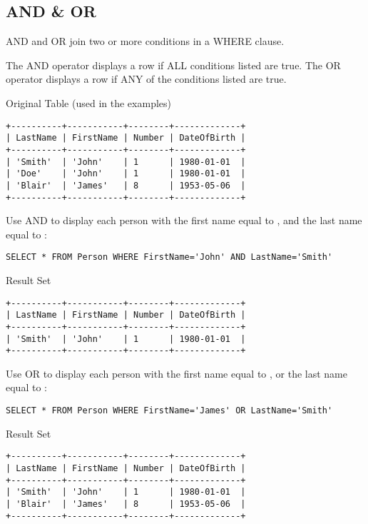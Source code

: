 \documentclass{howto}
\begin{document}
\subsection{AND \& OR}

AND and OR join two or more conditions in a WHERE clause.

The AND operator displays a row if ALL conditions listed are true. The OR operator displays a row if ANY of the conditions listed are true.

Original Table (used in the examples)
\begin{verbatim}
+----------+-----------+--------+-------------+
| LastName | FirstName | Number | DateOfBirth |
+----------+-----------+--------+-------------+
| 'Smith'  | 'John'    | 1      | 1980-01-01  |
| 'Doe'    | 'John'    | 1      | 1980-01-01  |
| 'Blair'  | 'James'   | 8      | 1953-05-06  |
+----------+-----------+--------+-------------+
\end{verbatim}

Use AND to display each person with the first name equal to , and the last name equal to :

\begin{verbatim}
SELECT * FROM Person WHERE FirstName='John' AND LastName='Smith'
\end{verbatim}

Result Set
\begin{verbatim}
+----------+-----------+--------+-------------+
| LastName | FirstName | Number | DateOfBirth |
+----------+-----------+--------+-------------+
| 'Smith'  | 'John'    | 1      | 1980-01-01  |
+----------+-----------+--------+-------------+
\end{verbatim}

Use OR to display each person with the first name equal to , or the last name equal to :

\begin{verbatim}
SELECT * FROM Person WHERE FirstName='James' OR LastName='Smith'
\end{verbatim}

Result Set
\begin{verbatim}
+----------+-----------+--------+-------------+
| LastName | FirstName | Number | DateOfBirth |
+----------+-----------+--------+-------------+
| 'Smith'  | 'John'    | 1      | 1980-01-01  |
| 'Blair'  | 'James'   | 8      | 1953-05-06  |
+----------+-----------+--------+-------------+
\end{verbatim}
\end{document}
